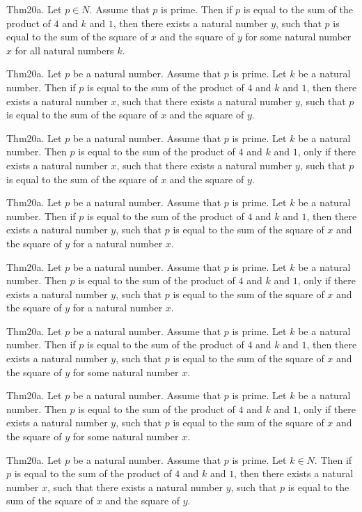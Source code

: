 \documentclass{article}
\begin{document}
Thm20a. Let $p \in N$. Assume that $p$ is prime. Then if $p$ is equal to the sum of the product of $4$ and $k$ and $1$, then there exists a natural number $y$, such that $p$ is equal to the sum of the square of $x$ and the square of $y$ for some natural number $x$ for all natural numbers $k$.

Thm20a. Let $p$ be a natural number. Assume that $p$ is prime. Let $k$ be a natural number. Then if $p$ is equal to the sum of the product of $4$ and $k$ and $1$, then there exists a natural number $x$, such that there exists a natural number $y$, such that $p$ is equal to the sum of the square of $x$ and the square of $y$.

Thm20a. Let $p$ be a natural number. Assume that $p$ is prime. Let $k$ be a natural number. Then $p$ is equal to the sum of the product of $4$ and $k$ and $1$, only if there exists a natural number $x$, such that there exists a natural number $y$, such that $p$ is equal to the sum of the square of $x$ and the square of $y$.

Thm20a. Let $p$ be a natural number. Assume that $p$ is prime. Let $k$ be a natural number. Then if $p$ is equal to the sum of the product of $4$ and $k$ and $1$, then there exists a natural number $y$, such that $p$ is equal to the sum of the square of $x$ and the square of $y$ for a natural number $x$.

Thm20a. Let $p$ be a natural number. Assume that $p$ is prime. Let $k$ be a natural number. Then $p$ is equal to the sum of the product of $4$ and $k$ and $1$, only if there exists a natural number $y$, such that $p$ is equal to the sum of the square of $x$ and the square of $y$ for a natural number $x$.

Thm20a. Let $p$ be a natural number. Assume that $p$ is prime. Let $k$ be a natural number. Then if $p$ is equal to the sum of the product of $4$ and $k$ and $1$, then there exists a natural number $y$, such that $p$ is equal to the sum of the square of $x$ and the square of $y$ for some natural number $x$.

Thm20a. Let $p$ be a natural number. Assume that $p$ is prime. Let $k$ be a natural number. Then $p$ is equal to the sum of the product of $4$ and $k$ and $1$, only if there exists a natural number $y$, such that $p$ is equal to the sum of the square of $x$ and the square of $y$ for some natural number $x$.

Thm20a. Let $p$ be a natural number. Assume that $p$ is prime. Let $k \in N$. Then if $p$ is equal to the sum of the product of $4$ and $k$ and $1$, then there exists a natural number $x$, such that there exists a natural number $y$, such that $p$ is equal to the sum of the square of $x$ and the square of $y$.
\end{document}
